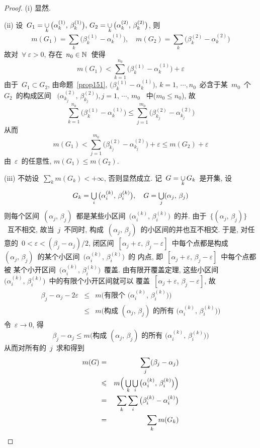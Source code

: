 \begin{proof}
(i) 显然.

(ii) 设~$G_1 = \mathop{\cup}\limits_k \big(\alpha^{(1)}_k,\,\beta^{(1)}_k\big),\,
G_2 = \mathop{\cup}\limits_k \big(\alpha^{(2)}_k,\,\beta^{(2)}_k \big)$, 则
\[
m(G_1) = \sum_k \big(\beta^{(1)}_k - \alpha^{(1)}_k\big), \quad m(G_2) =
\sum_k \big(\beta^{(2)}_k - \alpha^{(2)}_k\big)
\]
故对~$\forall~\varepsilon > 0$, 存在~$n_0 \in \mathbb{N}$~使得
\[
m(G_1) < \sum^{n_0}_{k=1} \big(\beta^{(1)}_k - \alpha^{(1)}_k\big) + \varepsilon
\]
由于~$G_1 \subset G_2$, 由命题~\ref{prop151}, $\big(\beta^{(1)}_k -
\alpha^{(1)}_k\big),\,k=1,\,\cdots,n_0$~必含于某~$m_0$~个~$G_2$~的构成区间
~$\big(\alpha^{(2)}_{k_j},\,\beta^{(2)}_{k_j} \big), j=1,\,\cdots,\,m_0$~
中($m_0 \leqslant n_0$), 故
\[
\sum^{n_0}_{k=1} \big(\beta^{(1)}_k - \alpha^{(1)}_k\big) \leqslant \sum^{m_0}_{j=1}
\big(\beta^{(2)}_{k_j} - \alpha^{(2)}_{k_j} \big)
\]
从而
\[
m(G_1) < \sum^{m_0}_{j=1} \big(\beta^{(2)}_{k_j} - \alpha^{(2)}_{k_j} \big) + \varepsilon \leqslant m(G_2) + \varepsilon
\]
由~$\varepsilon$~的任意性, $m(G_1) \leqslant m(G_2)$.

(iii) 不妨设~$\sum\limits_k m(G_k)<+\infty$, 否则显然成立.
记~$G = \mathop{\cup}\limits_k G_k$~是开集, 设
\[
G_k = \mathop{\textstyle{\bigcup}}\limits_i \big(\alpha^{(k)}_i,\, \beta^{(k)}_i \big),\quad
G = \mathop{\textstyle{\bigcup}}_j (\alpha_j, \, \beta_j)
\]
则每个区间~$(\alpha_j, \, \beta_j)$~都是某些小区间~$\big(\alpha^{(k)}_i,\,
\beta^{(k)}_i \big)$~的并. 由于~$\big\{(\alpha_j, \, \beta_j)\big\}$~互不相交,
故当~$j$~不同时, 构成~$(\alpha_j,\,\beta_j)$~的小区间的并也互不相交.
于是, 对任意的~$0 < \varepsilon < (\beta_j - \alpha_j)/2$,
闭区间~$[\alpha_j+\varepsilon,\,\beta_j -\varepsilon]$~中每个点都是构成
~$(\alpha_j,\,\beta_j)$~的某个小区间~$\big(\alpha^{(k)}_i,\, \beta^{(k)}_i \big)$~的
内点, 即~$[\alpha_j+\varepsilon,\,\beta_j -\varepsilon]$~中每个点都被
某个小开区间~$\big(\alpha^{(k)}_i,\, \beta^{(k)}_i \big)$~覆盖. 由有限开覆盖定理,
这些小区间~$\big(\alpha^{(k)}_i,\, \beta^{(k)}_i \big)$~中的有限个小开区间就可以
覆盖~$[\alpha_j+\varepsilon,\,\beta_j -\varepsilon]$, 故
\begin{eqnarray*}
\beta_j - \alpha_j - 2 \varepsilon &\leqslant& m\Big( \mbox{有限个~}
\big(\alpha^{(k)}_i,\, \beta^{(k)}_i \big) \Big) \\
&\leqslant& m \Big( \mbox{构成~}(\alpha_j, \, \beta_j)\mbox{~的所有~}
\big(\alpha^{(k)}_i,\, \beta^{(k)}_i \big) \Big)
\end{eqnarray*}
令~$\varepsilon \to 0$, 得
\[
\beta_j - \alpha_j \leqslant m \Big( \mbox{构成~}(\alpha_j, \, \beta_j)\mbox{~的所有~}
\big(\alpha^{(k)}_i,\, \beta^{(k)}_i \big) \Big)
\]
从而对所有的~$j$~求和得到
\begin{eqnarray*}
m(G) &=& \sum_j (\beta_j - \alpha_j) \\
&\leqslant& m\Big( \mathop{\textstyle{\bigcup}}_k \mathop{\textstyle{\bigcup}}_i \big( \alpha^{(k)}_i,\, \beta^{(k)}_i \big) \Big) \\
&=& \sum_k \sum_i \big(\beta^{(k)}_i - \alpha^{(k)}_i \big) \\
&=& \sum_k m(G_k)
\end{eqnarray*}


\end{proof}
